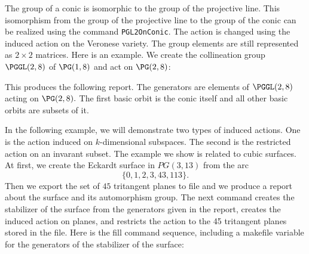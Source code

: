 \bigskip

The group of a conic is isomorphic to the group of the projective line. 
This isomorphism from the group of the projective line to the group of the conic can be realized using the 
command \verb'PGL2OnConic'. 
The action is changed using the induced action on the Veronese variety. 
The group elements are still represented as $2 \times 2$ matrices.
Here is an example. 
We create the collineation group $\PGGL(2,8)$ of $\PG(1,8)$ and act on $\PG(2,8)$:
{\tt

}
This produces the following report. 
The generators are elements of $\PGGL(2,8)$ acting on $\PG(2,8).$ 
The first basic orbit is the conic itself and all other basic orbits are subsets of it.
\begin{mdframed}[style=MyFrame]

\end{mdframed}

\bigskip


In the following example, we will demonstrate two types of induced actions. 
One is the action induced on $k$-dimensional subspaces. 
The second is the restricted action on an invarant subset.
The example we show is related to cubic surfaces.
At first, we create the Eckardt surface in $PG(3,13)$ from 
the arc 
$$
\{0,1,2,3,43,113\}. 
$$
Then we export the set of $45$ tritangent planes to file 
and we produce a report about the surface and its automorphism group.
The next command creates the stabilizer of the surface 
from the generators given in the report, 
creates the induced action on planes, 
and restricts the action to the 45 tritangent planes stored in the file.
Here is the fill command sequence, including a makefile variable 
for the generators of the stabilizer of the surface:
{\tt

}
{\tt

}


\bigskip




